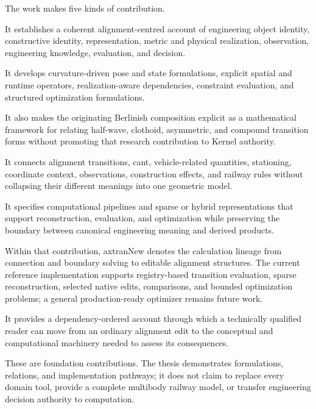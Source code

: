 The work makes five kinds of contribution.

\begin{description}[style=nextline]
\item[Conceptual contribution]
It establishes a coherent alignment-centred account of engineering object
identity, constructive identity, representation, metric and physical
realization, observation, engineering knowledge, evaluation, and decision.

\item[Formal and methodological contribution]
It develops curvature-driven pose and state formulations, explicit spatial and
runtime operators, realization-aware dependencies, constraint evaluation, and
structured optimization formulations.

It also makes the originating Berlinish composition explicit as a mathematical
framework for relating half-wave, clothoid, asymmetric, and compound transition
forms without promoting that research contribution to Kernel authority.

\item[Engineering contribution]
It connects alignment transitions, cant, vehicle-related quantities,
stationing, coordinate context, observations, construction effects, and railway
rules without collapsing their different meanings into one geometric model.

\item[Implementation and reference contribution]
It specifies computational pipelines and sparse or hybrid representations that
support reconstruction, evaluation, and optimization while preserving the
boundary between canonical engineering meaning and derived products.

Within that contribution, axtranNew denotes the calculation lineage from
connection and boundary solving to editable alignment structures. The current
reference implementation supports registry-based transition evaluation,
sparse reconstruction, selected native edits, comparisons, and bounded
optimization problems; a general production-ready optimizer remains future
work.

\item[Explanatory contribution]
It provides a dependency-ordered account through which a technically qualified
reader can move from an ordinary alignment edit to the conceptual and
computational machinery needed to assess its consequences.
\end{description}

These are foundation contributions. The thesis demonstrates formulations,
relations, and implementation pathways; it does not claim to replace every
domain tool, provide a complete multibody railway model, or transfer engineering
decision authority to computation.


